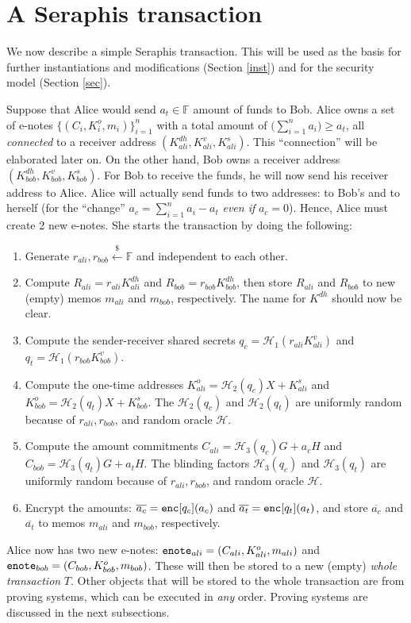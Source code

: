\documentclass{article}
\begin{document}
\section{A Seraphis transaction}\label{ser-tx}
We now describe a simple Seraphis transaction. This will be used as the basis for further instantiations and modifications (Section \ref{inst}) and for the security model (Section \ref{sec}).

Suppose that Alice would send $a_t\in\mathbb{F}$ amount of funds to Bob. Alice owns a set of e-notes $\{(C_i,K_i^o,m_i)\}_{i=1}^n$ with a total amount of $\big(\sum_{i=1}^{n}{a_i}\big)\ge a_t$, all \textit{connected} to a receiver address $(K_{ali}^{dh}, K_{ali}^v, K_{ali}^s)$. This ``connection'' will be elaborated later on. On the other hand, Bob owns a receiver address $(K_{bob}^{dh}, K_{bob}^v, K_{bob}^s)$. For Bob to receive the funds, he will now send his receiver address to Alice. Alice will actually send funds to two addresses: to Bob's and to herself (for the ``change'' $a_{c} = \sum_{i=1}^{n}{a_i} - a_t$ \textit{even if} $a_{c}=0$). Hence, Alice must create 2 new e-notes. She starts the transaction by doing the following:
\begin{enumerate}
    \item Generate $r_{ali}, r_{bob}\xleftarrow{\$}\mathbb{F}$ and independent to each other.
    \item Compute $R_{ali} = r_{ali}K_{ali}^{dh}$ and $R_{bob} = r_{bob}K_{bob}^{dh}$, then store $R_{ali}$ and $R_{bob}$ to new (empty) memos $m_{ali}$ and $m_{bob}$, respectively. The name for $K^{dh}$ should now be clear.
    \item Compute the sender-receiver shared secrets $q_c = \mathcal{H}_1(r_{ali}K_{ali}^{v})$ and $q_t = \mathcal{H}_1(r_{bob}K_{bob}^{v})$.
    \item Compute the one-time addresses $K_{ali}^o = \mathcal{H}_2(q_c)X + K_{ali}^s$ and $K_{bob}^o = \mathcal{H}_2(q_t)X + K_{bob}^s$. The $\mathcal{H}_2(q_c)$ and $\mathcal{H}_2(q_t)$ are uniformly random because of $r_{ali}, r_{bob}$, and random oracle $\mathcal{H}$.
    \item Compute the amount commitments $C_{ali} = \mathcal{H}_3(q_c)G + a_c H$ and $C_{bob} = \mathcal{H}_3(q_t)G + a_t H$. The blinding factors $\mathcal{H}_3(q_c)$ and $\mathcal{H}_3(q_t)$ are uniformly random because of $r_{ali}, r_{bob}$, and random oracle $\mathcal{H}$.
    \item Encrypt the amounts: $\overline{a_c} = {\tt enc}[q_c](a_c)$ and $\overline{a_t} = {\tt enc}[q_t](a_t)$, and store $\overline{a_c}$ and $\overline{a_t}$ to memos $m_{ali}$ and $m_{bob}$, respectively.
\end{enumerate}
Alice now has two new e-notes: ${\tt enote}_{ali} = (C_{ali}, K_{ali}^o, m_{ali})$ and ${\tt enote}_{bob} = (C_{bob}, K_{bob}^o, m_{bob})$. These will then be stored to a new (empty) \textit{whole transaction} $T$. Other objects that will be stored to the whole transaction are from proving systems, which can be executed in \textit{any} order. Proving systems are discussed in the next subsections.
\end{document}
